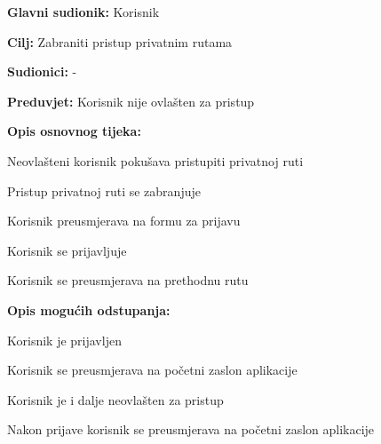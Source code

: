 \noindent {}
\begin{packed_item}
	
	\item \textbf{Glavni sudionik:} Korisnik
	\item \textbf{Cilj:} Zabraniti pristup privatnim rutama
	\item \textbf{Sudionici:} -
	\item \textbf{Preduvjet:} Korisnik nije ovlašten za pristup
	\item \textbf{Opis osnovnog tijeka:}
	
	\item[] \begin{packed_enum}
		
		\item Neovlašteni korisnik pokušava pristupiti privatnoj ruti
		\item Pristup privatnoj ruti se zabranjuje
		\item Korisnik preusmjerava na formu za prijavu
		\item Korisnik se prijavljuje
		\item Korisnik se preusmjerava na prethodnu rutu

	\end{packed_enum}
	
	\item  \textbf{Opis mogućih odstupanja:}
	
	\item[] \begin{packed_item}
		
		\item[3.a] Korisnik je prijavljen
		\item[] \begin{packed_enum}
			
			\item Korisnik se preusmjerava na početni zaslon aplikacije 
			
		\end{packed_enum}
		
		\item[5.a] Korisnik je i dalje neovlašten za pristup
		\item[] \begin{packed_enum}
			
			\item Nakon prijave korisnik se preusmjerava na početni zaslon aplikacije
			
		\end{packed_enum}
		
	\end{packed_item}
\end{packed_item}

